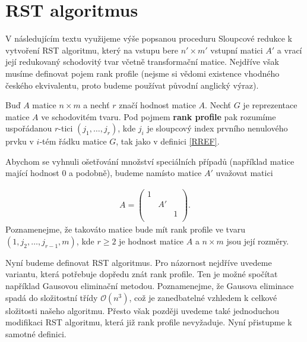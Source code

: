 \section{RST algoritmus}
V následujícím textu využijeme výše popsanou proceduru Sloupcové redukce k vytvoření
RST algoritmu, který na vstupu bere $ n' \times m' $ vstupní matici $ A' $ a
vrací její redukovaný schodovitý tvar včetně transformační matice. Nejdříve však
musíme definovat pojem rank profile (nejsme si vědomi existence vhodného českého
ekvivalentu, proto budeme používat původní anglický výraz).

\begin{defi}
Buď $ A $ matice $ n \times m $ a nechť $ r $ značí hodnost matice $ A $. Nechť
$ G $ je reprezentace matice $ A $ ve schodovitém tvaru. Pod pojmem
\textbf{rank profile} pak rozumíme uspořádanou $ r $-tici $ (j_1, \dots, j_r) $, kde
$ j_i $ je sloupcový index prvního nenulového prvku v $ i $-tém řádku matice $ G $,
tak jako v definici \ref{RREF}.
\end{defi}

Abychom se vyhnuli ošetřování množství speciálních případů (například matice
mající hodnost $ 0 $ a podobně), budeme namísto matice $ A' $ uvažovat matici

\begin{align} \label{input_A}
A =
    \begin{pmatrix}
        1 &    &   \\
          & A' &   \\
          &    & 1 \\
    \end{pmatrix}
.
\end{align}
Poznamenejme, že takováto matice bude mít rank profile ve tvaru
$ (1, j_2, \dots, j_{r - 1}, m) $, kde $ r \geq 2 $ je hodnost matice $ A $ a
$ n \times m $ jsou její rozměry.

Nyní budeme definovat RST algoritmus. Pro názornost nejdříve uvedeme variantu,
která potřebuje dopředu znát rank profile. Ten je možné spočítat například
Gausovou eliminační metodou. Poznamenejme, že Gausova eliminace spadá do složitostní
třídy $ \mathcal{O}(n^3) $, což je zanedbatelné vzhledem k celkové složitosti
našeho algoritmu. Přesto však později uvedeme také jednoduchou modifikaci RST
algoritmu, která již rank profile nevyžaduje. Nyní přistupme k samotné definici.

